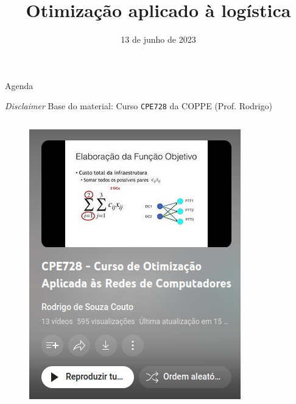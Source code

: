 \documentclass{beamer}
\title{Otimização aplicado à logística}
\author[Alan Peterson, Erick Manjarra, Felipe Gomes, Felipe Kuang, Fernando Dias, Lucas Tiné]{%
  \texorpdfstring{%
    \begin{columns}
      \column{.3\linewidth}
      \centering
      Alan Peterson
      \column{.3\linewidth}
      \centering
      Felipe Kuang 
    \end{columns}
    \vspace{1pt}
    \begin{columns}
      \column{.3\linewidth}
      \centering
      Erick Manjarra
      \column{.3\linewidth}
      \centering
      Fernando Dias 
    \end{columns}
    \vspace{1pt}
    \begin{columns}
      \column{.3\linewidth}
      \centering
      Felipe Gomes
      \column{.3\linewidth}
      \centering
      Lucas Tiné
    \end{columns}
 }
 {Alan Peterson, Erick Manjarra, Felipe Gomes, Felipe Kuang, Fernando Dias, Lucas Tiné}
}
\date{13 de junho de 2023}
\begin{document}
\begin{frame}
    \maketitle
\end{frame}

\begin{frame}{Agenda}
    \tableofcontents
\end{frame}



\begin{frame}{\textit{Disclaimer}}
    Base do material: Curso \texttt{CPE728} da COPPE (Prof. Rodrigo) \cite{CPE728CursoOtimizacaoAplicadaasRedesComputadoresYouTube_www.youtube.com}
    \begin{columns}
        \begin{figure}
            \centering
            \includegraphics[width=\textwidth]{assets/Introducao/PlaylistRodrigoThumbnail.png}
        \end{figure}

\end{columns}
\end{frame}
\end{document}
